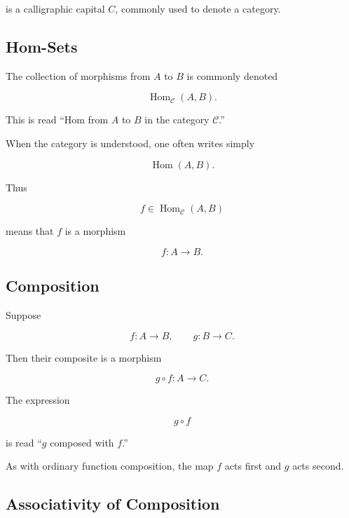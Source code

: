 is a calligraphic capital \(C\), commonly used to denote a category.

\subsection{Hom-Sets}
\label{subsec:hom-sets}

The collection of morphisms from \(A\) to \(B\) is commonly denoted

\[ \operatorname{Hom}_{\mathcal C}(A,B). \]

This is read ``Hom from \(A\) to \(B\) in the category \(\mathcal C\).''

When the category is understood, one often writes simply

\[ \operatorname{Hom}(A,B). \]

Thus

\[ f\in\operatorname{Hom}_{\mathcal C}(A,B) \]

means that \(f\) is a morphism

\[ f:A\to B. \]

\subsection{Composition}
\label{subsec:categorical-composition}

Suppose

\[ f:A\to B,\qquad g:B\to C. \]

Then their composite is a morphism

\[ g\circ f:A\to C. \]

The expression

\[ g\circ f \]

is read ``\(g\) composed with \(f\).''

As with ordinary function composition, the map \(f\) acts first and \(g\)
acts second.

\begin{center}
\end{center}

\subsection{Associativity of Composition}
\label{subsec:category-associativity}

